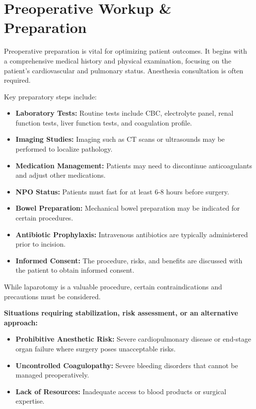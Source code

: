 \section*{Preoperative Workup \& Preparation}
Preoperative preparation is vital for optimizing patient outcomes. It begins with a comprehensive medical history and physical examination, focusing on the patient's cardiovascular and pulmonary status. Anesthesia consultation is often required.

Key preparatory steps include:

\begin{itemize}
  \item \textbf{Laboratory Tests:} Routine tests include CBC, electrolyte panel, renal function tests, liver function tests, and coagulation profile.

  \item \textbf{Imaging Studies:} Imaging such as CT scans or ultrasounds may be performed to localize pathology.

  \item \textbf{Medication Management:} Patients may need to discontinue anticoagulants and adjust other medications.

  \item \textbf{NPO Status:} Patients must fast for at least 6-8 hours before surgery.

  \item \textbf{Bowel Preparation:} Mechanical bowel preparation may be indicated for certain procedures.

  \item \textbf{Antibiotic Prophylaxis:} Intravenous antibiotics are typically administered prior to incision.

  \item \textbf{Informed Consent:} The procedure, risks, and benefits are discussed with the patient to obtain informed consent.
\end{itemize}

While laparotomy is a valuable procedure, certain contraindications and precautions must be considered.

\textbf{Situations requiring stabilization, risk assessment, or an alternative approach:}
\begin{itemize}
  \item \textbf{Prohibitive Anesthetic Risk:} Severe cardiopulmonary disease or end-stage organ failure where surgery poses unacceptable risks.
  \item \textbf{Uncontrolled Coagulopathy:} Severe bleeding disorders that cannot be managed preoperatively.
  \item \textbf{Lack of Resources:} Inadequate access to blood products or surgical expertise.
\end{itemize}

